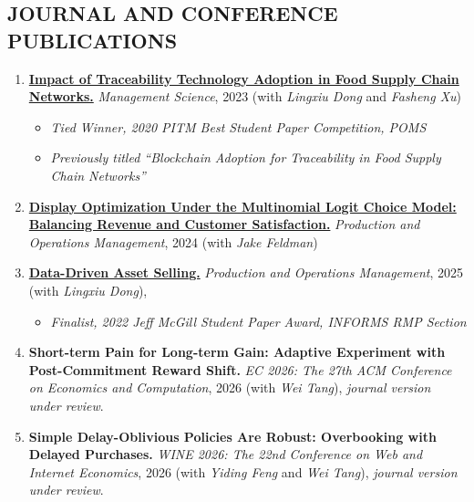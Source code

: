 \documentclass[margin]{res} %
\begin{document}
\begin{resume}
\section{JOURNAL AND CONFERENCE PUBLICATIONS}
\begin{enumerate}[leftmargin=*]
    \item %
        \href{https://pubsonline.informs.org/doi/abs/10.1287/mnsc.2022.4440?casa_token=br5-nMm53OIAAAAA:nQxcEPswA7DUJZgJ1CZsL0DModEzd-a-1Y5zOh68ebSQo1LU177cocuRpaC3BXYQcoELLTilwzPY}{\textbf{Impact of Traceability Technology Adoption in Food Supply Chain Networks.}} {\it Management Science}, 2023 (with {\it Lingxiu Dong} and {\it Fasheng Xu})
        \begin{itemize}
            \item[--] {\it Tied Winner, 2020 PITM Best Student Paper Competition, POMS}
            \item[--] {\it Previously titled ``Blockchain Adoption for Traceability in Food Supply Chain Networks''}
        \end{itemize}
    \item \href{https://journals.sagepub.com/doi/full/10.1111/poms.14040}{\textbf{Display Optimization Under the Multinomial Logit Choice Model: Balancing Revenue and Customer Satisfaction.}} {\it Production and Operations Management}, 2024 (with {\it Jake Feldman})
    \item \href{https://journals.sagepub.com/doi/full/10.1177/10591478251396609}{\textbf{Data-Driven Asset Selling.}} {\it Production and Operations Management}, 2025 (with {\it Lingxiu Dong}), 
        \begin{itemize}
            \item[--] {\it Finalist, 2022 Jeff McGill Student Paper Award, INFORMS RMP Section}
        \end{itemize}
      \item \textbf{Short-term Pain for Long-term Gain: Adaptive Experiment with Post-Commitment Reward Shift.} {\it EC 2026: The 27th ACM Conference on Economics and Computation}, 2026 (with {\it Wei Tang}), \textit{journal version under review}.
      \item \textbf{Simple Delay-Oblivious Policies Are Robust: Overbooking with Delayed Purchases.} {\it WINE 2026: The 22nd Conference on Web and Internet Economics}, 2026 (with {\it Yiding Feng} and {\it Wei Tang}), \textit{journal version under review}.
\end{enumerate}



\end{resume}
\end{document}
